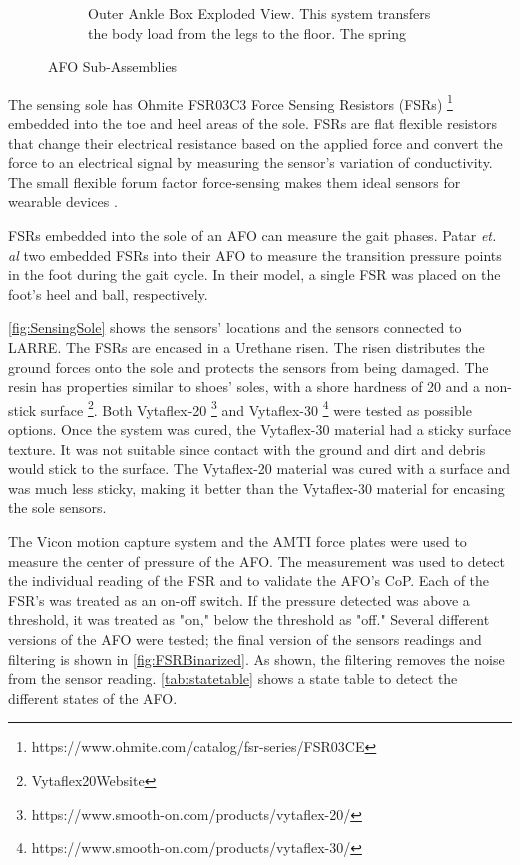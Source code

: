 \begin{figure}[h!]
\begin{subfigure}[b]{.45\textwidth}
        \caption{Outer Ankle Box Exploded View. This system transfers the body load from the legs to the floor. The spring }
        \label{fig:Outer Ankle Box fig}
    \end{subfigure}%
    \caption{AFO Sub-Assemblies}
    \label{fig:AFO Sub-Assemblies}
\end{figure}


The sensing sole has Ohmite FSR03C3 Force Sensing Resistors (FSRs) \footnote{https://www.ohmite.com/catalog/fsr-series/FSR03CE} embedded into the toe and heel areas of the sole. FSRs are flat flexible resistors that change their electrical resistance based on the applied force \cite{yaniger1991force} and convert the force to an electrical signal by measuring the sensor's variation of conductivity. The small flexible forum factor force-sensing makes them ideal sensors for wearable devices \cite{giovanelli2016force}.    

FSRs embedded into the sole of an AFO can measure the gait phases. Patar \textit{et. al} two embedded FSRs into their AFO to measure the transition pressure points in the foot during the gait cycle\cite{ab2014system}. In their model, a single FSR was placed on the foot's heel and ball, respectively.  

\autoref{fig:SensingSole} shows the sensors' locations and the sensors connected to LARRE. The FSRs are encased in a Urethane risen. The risen distributes the ground forces onto the sole and protects the sensors from being damaged. The resin has properties similar to shoes' soles, with a shore hardness of 20 and a non-stick surface \footnote{Vytaflex20Website}. Both Vytaflex-20 \footnote{https://www.smooth-on.com/products/vytaflex-20/} and Vytaflex-30 \footnote{https://www.smooth-on.com/products/vytaflex-30/} were tested as possible options. Once the system was cured, the Vytaflex-30 material had a sticky surface texture. It was not suitable since contact with the ground and dirt and debris would stick to the surface. The Vytaflex-20 material was cured with a surface and was much less sticky, making it better than the Vytaflex-30 material for encasing the sole sensors. 

The Vicon motion capture system and the AMTI force plates were used to measure the center of pressure of the AFO.  The measurement was used to detect the individual reading of the FSR and to validate the AFO's CoP. Each of the FSR's was treated as an on-off switch. If the pressure detected was above a threshold, it was treated as "on," below the threshold as "off."  Several different versions of the AFO were tested; the final version of the sensors readings and filtering is shown in \autoref{fig:FSRBinarized}. As shown, the filtering removes the noise from the sensor reading. \autoref{tab:statetable} shows a state table to detect the different states of the AFO. 

